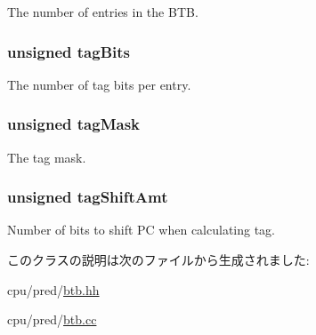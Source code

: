 \label{classDefaultBTB_a325de474a9f6652329339d9fc2ea09c0}
The number of entries in the BTB. \hypertarget{classDefaultBTB_a451757836c6c786aee898c2af4a278ae}{
\subsubsection[{tagBits}]{\setlength{\rightskip}{0pt plus 5cm}unsigned {\bf tagBits}}}
\label{classDefaultBTB_a451757836c6c786aee898c2af4a278ae}
The number of tag bits per entry. \hypertarget{classDefaultBTB_a94589d3da2ffd10f97c00aab77a3a7cb}{
\subsubsection[{tagMask}]{\setlength{\rightskip}{0pt plus 5cm}unsigned {\bf tagMask}}}
\label{classDefaultBTB_a94589d3da2ffd10f97c00aab77a3a7cb}
The tag mask. \hypertarget{classDefaultBTB_a44f1c7028775ed7ca93312fd8ec04f22}{
\subsubsection[{tagShiftAmt}]{\setlength{\rightskip}{0pt plus 5cm}unsigned {\bf tagShiftAmt}}}
\label{classDefaultBTB_a44f1c7028775ed7ca93312fd8ec04f22}
Number of bits to shift PC when calculating tag. 

このクラスの説明は次のファイルから生成されました:\begin{DoxyCompactItemize}
\item 
cpu/pred/\hyperlink{btb_8hh}{btb.hh}\item 
cpu/pred/\hyperlink{btb_8cc}{btb.cc}\end{DoxyCompactItemize}
